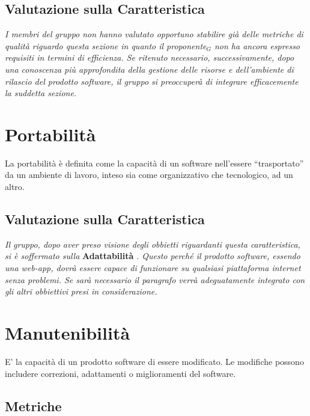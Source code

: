 \subsection{Valutazione sulla Caratteristica} \label{QualitàDelProdottoEfficienzaValutazioneSullaCaratteristica}
\textit{I membri del gruppo non hanno valutato opportuno stabilire già delle metriche di qualità riguardo questa sezione in quanto il proponente$_G$ non ha ancora espresso requisiti in termini di efficienza. Se ritenuto necessario, successivamente, dopo una conoscenza più approfondita della gestione delle risorse e dell’ambiente di rilascio del prodotto software, il gruppo si preoccuperà di integrare efficacemente la suddetta sezione.}

\section{Portabilità} \label{QualitàDelProdottoPortabilità}
La portabilità è definita come la capacità di un software nell’essere “trasportato” da un ambiente di lavoro, inteso sia come organizzativo che tecnologico,  ad un altro.

\subsection{Valutazione sulla Caratteristica} \label{QualitàDelProdottoPortabilitàValutazioneSullaCaratteristica}
\textit{Il gruppo, dopo aver preso visione degli obbietti riguardanti questa caratteristica, si è soffermato sulla }\textbf{Adattabilità} \textit{.
Questo perché il prodotto software, essendo una web-app, dovrà essere capace di funzionare su qualsiasi piattaforma internet senza problemi.
Se sarà necessario il paragrafo verrà adeguatamente integrato con gli altri obbiettivi presi in considerazione.}

\section{Manutenibilità} \label{QualitàDelProdottoManutenibilità}
E' la capacità di un prodotto software di essere modificato. Le modifiche possono includere correzioni, adattamenti o miglioramenti del software.
\subsection{Metriche}  \label{QualitàDelProdottoManutenibilitàMetriche}
